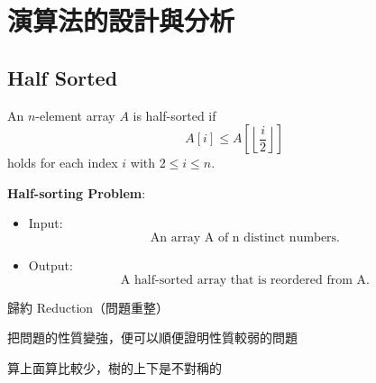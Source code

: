 \begin{remark}
\end{remark}

\chapter{演算法的設計與分析}

\section{Half Sorted}
\begin{definition}
    An $n$-element array $A$ is half-sorted if
    \[
        A[i] \leq A\left[ \left\lfloor \frac{i}{2} \right\rfloor \right]
    \]
    holds for each index $i$ with $2 \leq i \leq n$.
\end{definition}

\textbf{Half-sorting Problem}:
\begin{itemize}
    \item Input: \[
        \text{An array A of n distinct numbers.}
    \]
    \item Output: \[
        \text{A half-sorted array that is reordered from A.}
    \]
\end{itemize}

\begin{note}
歸約 Reduction（問題重整）
\end{note}

\begin{note}
把問題的性質變強，便可以順便證明性質較弱的問題
\end{note}

\begin{definition}[順調法]
    
\end{definition}

算上面算比較少，樹的上下是不對稱的


